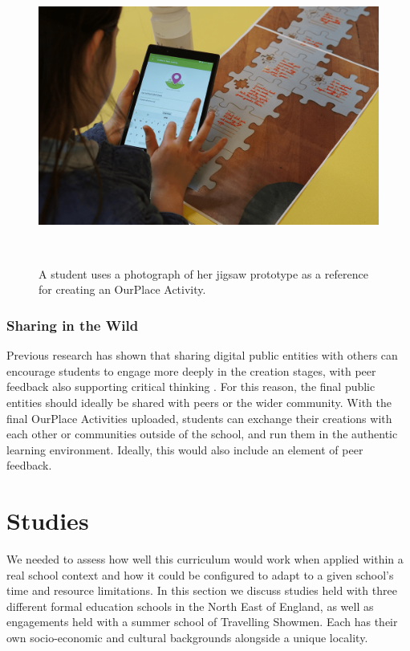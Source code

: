 \documentclass[,hyphens]{sigchi}
\begin{document}
\begin{figure}
\centering
  \includegraphics[width=1\columnwidth]{figures/jigsawToApp}
  \caption{A student uses a photograph of her jigsaw prototype as a reference for creating an OurPlace Activity.}~\label{fig:JigsawToApp}
\end{figure}

\subsubsection{Sharing in the Wild}
Previous research has shown that sharing digital public entities with others can encourage students to engage more deeply in the creation stages, with peer feedback also supporting critical thinking \cite{Sarangapani2018}. For this reason, the final public entities should ideally be shared with peers or the wider community. With the final OurPlace Activities uploaded, students can exchange their creations with each other or communities outside of the school, and run them in the authentic learning environment. Ideally, this would also include an element of peer feedback. 

\section{Studies}
We needed to assess how well this curriculum would work when applied within a real school context and how it could be configured to adapt to a given school's time and resource limitations. In this section we discuss studies held with three different formal education schools in the North East of England, as well as engagements held with a summer school of Travelling Showmen. Each has their own socio-economic and cultural backgrounds alongside a unique locality.
\end{document}
